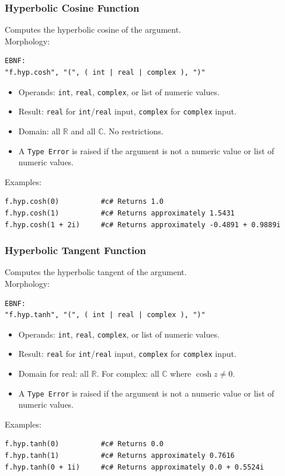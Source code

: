 \subsubsection{Hyperbolic Cosine Function}
Computes the hyperbolic cosine of the argument. \\
Morphology:
\begin{verbatim}
EBNF:
"f.hyp.cosh", "(", ( int | real | complex ), ")"
\end{verbatim}
\begin{itemize}
\item Operands: \texttt{int}, \texttt{real}, \texttt{complex}, or list of numeric values.
\item Result: \texttt{real} for \texttt{int}/\texttt{real} input, \texttt{complex} for \texttt{complex} input.
\item Domain: all $\mathbb{R}$ and all $\mathbb{C}$. No restrictions.
\item A \texttt{Type Error} is raised if the argument is not a numeric value or list of numeric values.
\end{itemize}
Examples:
\begin{verbatim}
f.hyp.cosh(0)          #c# Returns 1.0
f.hyp.cosh(1)          #c# Returns approximately 1.5431
f.hyp.cosh(1 + 2i)     #c# Returns approximately -0.4891 + 0.9889i
\end{verbatim}

\subsubsection{Hyperbolic Tangent Function}
Computes the hyperbolic tangent of the argument. \\
Morphology:
\begin{verbatim}
EBNF:
"f.hyp.tanh", "(", ( int | real | complex ), ")"
\end{verbatim}
\begin{itemize}
\item Operands: \texttt{int}, \texttt{real}, \texttt{complex}, or list of numeric values.
\item Result: \texttt{real} for \texttt{int}/\texttt{real} input, \texttt{complex} for \texttt{complex} input.
\item Domain for real: all $\mathbb{R}$. For complex: all $\mathbb{C}$ where $\cosh z \neq 0$.
\item A \texttt{Type Error} is raised if the argument is not a numeric value or list of numeric values.
\end{itemize}
Examples:
\begin{verbatim}
f.hyp.tanh(0)          #c# Returns 0.0
f.hyp.tanh(1)          #c# Returns approximately 0.7616
f.hyp.tanh(0 + 1i)     #c# Returns approximately 0.0 + 0.5524i
\end{verbatim}

